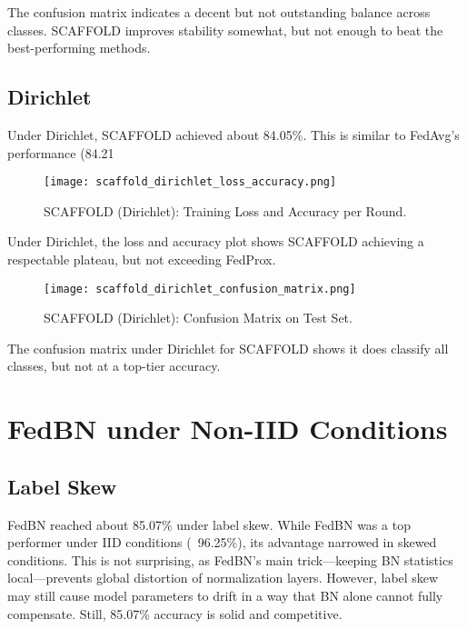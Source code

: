 \documentclass[12pt,a4paper]{report}
\begin{document}
The confusion matrix indicates a decent but not outstanding balance across classes. SCAFFOLD improves stability somewhat, but not enough to beat the best-performing methods.

\subsection{Dirichlet}
Under Dirichlet, SCAFFOLD achieved about 84.05\%. This is similar to FedAvg’s performance (84.21%

\begin{figure}[H]
	\centering
	\texttt{[image: scaffold\_dirichlet\_loss\_accuracy.png]}
	\caption{SCAFFOLD (Dirichlet): Training Loss and Accuracy per Round.}
\end{figure}

Under Dirichlet, the loss and accuracy plot shows SCAFFOLD achieving a respectable plateau, but not exceeding FedProx.

\begin{figure}[H]
	\centering
	\texttt{[image: scaffold\_dirichlet\_confusion\_matrix.png]}
	\caption{SCAFFOLD (Dirichlet): Confusion Matrix on Test Set.}
\end{figure}

The confusion matrix under Dirichlet for SCAFFOLD shows it does classify all classes, but not at a top-tier accuracy.

\section{FedBN under Non-IID Conditions}

\subsection{Label Skew}
FedBN reached about 85.07\% under label skew. While FedBN was a top performer under IID conditions (~96.25\%), its advantage narrowed in skewed conditions. This is not surprising, as FedBN’s main trick—keeping BN statistics local—prevents global distortion of normalization layers. However, label skew may still cause model parameters to drift in a way that BN alone cannot fully compensate. Still, 85.07\% accuracy is solid and competitive.
\end{document}
